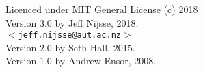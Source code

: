 \documentclass[a4paper]{book}
\begin{document}
 Licenced under MIT General License (c) 2018 \\     
 
 Version 3.0 by Jeff Nijsse, 2018.\\
 $<$\texttt{jeff.nijsse@aut.ac.nz}$>$\\
 Version 2.0 by Seth Hall, 2015.\\
 Version 1.0 by Andrew Ensor, 2008.
 
 
    
    
    \tableofcontents

  \mainmatter
%    
%    
%    
%    
%    
%    

  \appendix
%    
\end{document}
